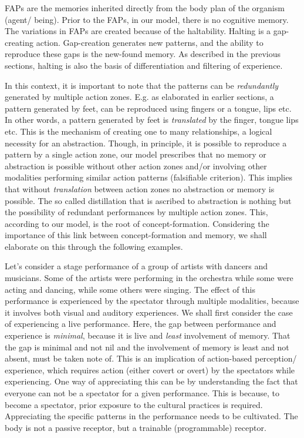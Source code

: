 FAPs are the memories inherited directly from the body plan of the organism (agent/ being). Prior to the FAPs, in our model, there is no cognitive memory. The variations in FAPs are created because of the haltability. Halting is a gap-creating action. Gap-creation generates new patterns, and the ability to reproduce these gaps is the new-found memory. As described in the previous sections, halting is also the basis of differentiation and filtering of experience. 

In this context, it is important to note that the patterns can be \textit{redundantly} generated by multiple action zones. E.g. as elaborated in earlier sections, a pattern generated by feet, can be reproduced using fingers or a tongue, lips etc. In other words, a pattern generated by feet is \textit{translated} by the finger, tongue lips etc. This is the mechanism of creating one to many relationships, a logical necessity for an abstraction. Though, in principle, it is possible to reproduce a pattern by a single action zone, our model prescribes that no memory or abstraction is possible without other action zones and/or involving other modalities performing similar action patterns (falsifiable criterion). This implies that without \textit{translation} between action zones no abstraction or memory is possible. The so called distillation that is ascribed to abstraction is nothing but the possibility of redundant performances by multiple action zones. This, according to our model, is the root of concept-formation. Considering the importance of this link between concept-formation and memory, we shall elaborate on this through the following examples.

Let's consider a stage performance of a group of artists with dancers and musicians. Some of the artists were performing in the orchestra while some were acting and dancing, while some others were singing. The effect of this performance is experienced by the spectator through multiple modalities, because it involves both visual and auditory experiences. We shall first consider the case of experiencing a live performance. Here, the gap between performance and experience is \textit{minimal}, because it is live and \textit{least} involvement of memory. That the gap is minimal and not nil and the involvement of memory is least and not absent, must be taken note of. This is an implication of action-based perception/ experience, which requires action (either covert or overt) by the spectators while experiencing. One way of appreciating this can be by understanding the fact that everyone can not be a spectator for a given performance. This is because, to become a spectator, prior exposure to the cultural practices is required. Appreciating the specific patterns in the performance needs to be cultivated. The body is not a passive receptor, but a trainable (programmable) receptor. 

